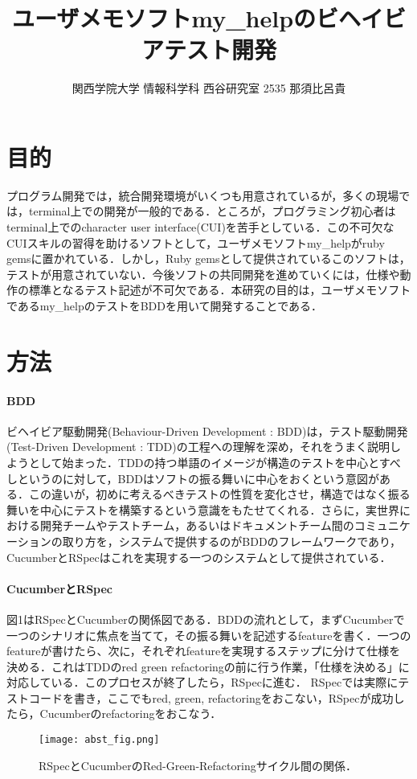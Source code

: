 \documentclass[10pt,a4j,twocolumn]{jsarticle}
\begin{document}
\title{ユーザメモソフトmy\_helpのビヘイビアテスト開発}
\author{関西学院大学 情報科学科 西谷研究室 2535 那須比呂貴}
\date{}
\maketitle
\section{目的}
\vspace{-0.5em}
プログラム開発では，統合開発環境がいくつも用意されているが，多くの現場では，terminal上での開発が一般的である．ところが，プログラミング初心者はterminal上でのcharacter user interface(CUI)を苦手としている．この不可欠なCUIスキルの習得を助けるソフトとして，ユーザメモソフトmy\_helpがruby gemsに置かれている．しかし，Ruby gemsとして提供されているこのソフトは，テストが用意されていない．今後ソフトの共同開発を進めていくには，仕様や動作の標準となるテスト記述が不可欠である．本研究の目的は，ユーザメモソフトであるmy\_helpのテストをBDDを用いて開発することである．

\section{方法}
\vspace{-0.5em}
\paragraph{BDD}
ビヘイビア駆動開発(Behaviour-Driven Development : BDD)は，テスト駆動開発(Test-Driven Development : TDD)の工程への理解を深め，それをうまく説明しようとして始まった．TDDの持つ単語のイメージが構造のテストを中心とすべしというのに対して，BDDはソフトの振る舞いに中心をおくという意図がある．この違いが，初めに考えるべきテストの性質を変化させ，構造ではなく振る舞いを中心にテストを構築するという意識をもたせてくれる．さらに，実世界における開発チームやテストチーム，あるいはドキュメントチーム間のコミュニケーションの取り方を，システムで提供するのがBDDのフレームワークであり，CucumberとRSpecはこれを実現する一つのシステムとして提供されている\cite{RSpecBook}．

\paragraph{CucumberとRSpec}
図1はRSpecとCucumberの関係図である．BDDの流れとして，まずCucumberで一つのシナリオに焦点を当てて，その振る舞いを記述するfeatureを書く．一つのfeatureが書けたら、次に，それぞれfeatureを実現するステップに分けて仕様を決める．これはTDDのred green refactoringの前に行う作業，「仕様を決める」に対応している．このプロセスが終了したら，RSpecに進む．
RSpecでは実際にテストコードを書き，ここでもred, green, refactoringをおこない，RSpecが成功したら，Cucumberのrefactoringをおこなう．
\begin{figure}
\begin{center}
\texttt{[image: abst\_fig.png]}
\caption{RSpecとCucumberのRed-Green-Refactoringサイクル間の関係．}
\end{center}
\vspace{-3em}
\end{figure}
\end{document}
